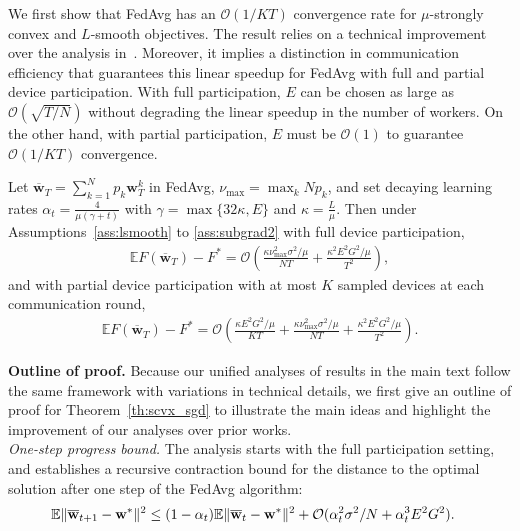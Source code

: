 We first show that FedAvg has an $\mathcal{O}(1/KT)$ convergence rate
for $\mu$-strongly convex and $L$-smooth objectives. The result relies on a technical improvement over the analysis in~\cite{li2019convergence}. Moreover, it
implies a distinction in communication efficiency that guarantees
this linear speedup for FedAvg with full and partial device participation.
With full participation, $E$ can be chosen as large as $\mathcal{O}(\sqrt{T/N})$
without degrading the linear speedup in the number of workers. On
the other hand, with partial participation, $E$ must be $\mathcal{O}(1)$
to guarantee $\mathcal{O}(1/KT)$ convergence.
\begin{theorem}
	\label{thm:SGD_scvx}Let $\overline{\mathbf{w}}_{T}=\sum_{k=1}^{N}p_{k}\mathbf{w}_{T}^{k}$ in FedAvg,
	$\nu_{\max}=\max_{k}Np_{k}$, and set decaying learning rates $\alpha_{t}=\frac{4}{\mu(\gamma+t)}$
	with $\gamma=\max\{32\kappa,E\}$ and $\kappa=\frac{L}{\mu}$. Then
	under Assumptions~\ref{ass:lsmooth} to \ref{ass:subgrad2} with full device participation, 
	\begin{align*}
	\mathbb{E}F(\overline{\mathbf{w}}_{T})-F^{\ast}=\mathcal{O}\left(\frac{\kappa\nu_{\max}^{2}\sigma^{2}/\mu}{NT}+\frac{\kappa^{2}E^{2}G^{2}/\mu}{T^{2}}\right),
	\end{align*}
	and with partial device participation with at most $K$ sampled devices
	at each communication round, 
	{\small \begin{align*}
	\mathbb{E}F(\overline{\mathbf{w}}_{T})-F^{\ast}=\mathcal{O}\left(\frac{\kappa E^{2}G^{2}/\mu}{KT}+\frac{\kappa\nu_{\max}^{2}\sigma^{2}/\mu}{NT}+\frac{\kappa^{2}E^{2}G^{2}/\mu}{T^{2}}\right).
	\end{align*}}
	\label{th:scvx_sgd}
\end{theorem}
\textbf{Outline of proof.} Because our unified analyses of results in the main text follow the same framework with variations in technical details, we first give an outline of proof for Theorem~\ref{th:scvx_sgd} to illustrate the main ideas and highlight the improvement of our analyses over prior works.\\
\textit{One-step progress bound.} The analysis starts with the full participation setting, and establishes a recursive contraction bound for the distance to the optimal solution after one step of the FedAvg algorithm:
\begin{align*}
	\mathbb{E}\|{\overline{\mathbf{w}}}_{t+1}-{\mathbf{w}}^{\ast}\|^{2} & \leq (1-\alpha_t)\mathbb{E}\|{\overline{\mathbf{w}}}_{t}-{\mathbf{w}}^{\ast}\|^{2}+ {\mathcal{O}}(\alpha_t^2 \sigma^2/N + \alpha_t^3E^2G^2).
\end{align*}
